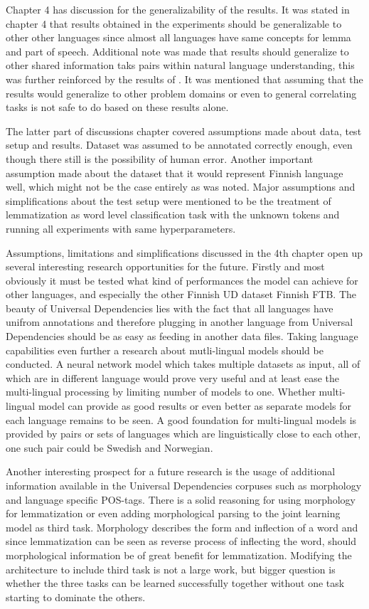 \documentclass[12pt,a4paper,english
]{tutthesis}
\begin{document}
Chapter 4 has discussion for the generalizability of the results. It was stated in chapter 4 that results obtained in the experiments should be generalizable to other other languages since almost all languages have same concepts for lemma and part of speech. Additional note was made that results should generalize to other shared information taks pairs within natural language understanding, this was further reinforced by the results of \cite{Liu2016a}. It was mentioned that assuming that the results would generalize to other problem domains or even to general correlating tasks is not safe to do based on these results alone. 

The latter part of discussions chapter covered assumptions made about data, test setup and results. Dataset was assumed to be annotated correctly enough, even though there still is the possibility of human error. Another important assumption made about the dataset that it would represent Finnish language well, which might not be the case entirely as was noted. Major assumptions and simplifications about the test setup were mentioned to be the treatment of lemmatization as word level classification task with the unknown tokens and running all experiments with same hyperparameters.

Assumptions, limitations and simplifications discussed in the 4th chapter open up several interesting research opportunities for the future. Firstly and most obviously it must be tested what kind of performances the model can achieve for other languages, and especially the other Finnish UD dataset Finnish FTB. The beauty of Universal Dependencies lies with the fact that all languages have unifrom annotations and therefore plugging in another language from Universal Dependencies should be as easy as feeding in another data files. Taking language capabilities even further a research about mutli-lingual models should be conducted. A neural network model which takes multiple datasets as input, all of which are in different language would prove very useful and at least ease the multi-lingual processing by limiting number of models to one. Whether multi-lingual model can provide as good results or even better as separate models for each language remains to be seen. A good foundation for multi-lingual models is provided by pairs or sets of languages which are linguistically close to each other, one such pair could be Swedish and Norwegian.

Another interesting prospect for a future research is the usage of additional information available in the Universal Dependencies corpuses such as morphology and language specific POS-tags. There is a solid reasoning for using morphology for lemmatization or even adding morphological parsing to the joint learning model as third task. Morphology describes the form and inflection of a word and since lemmatization can be seen as reverse process of inflecting the word, should morphological information be of great benefit for lemmatization. Modifying the architecture to include third task is not a large work, but bigger question is whether the three tasks can be learned successfully together without one task starting to dominate the others.
\end{document}
